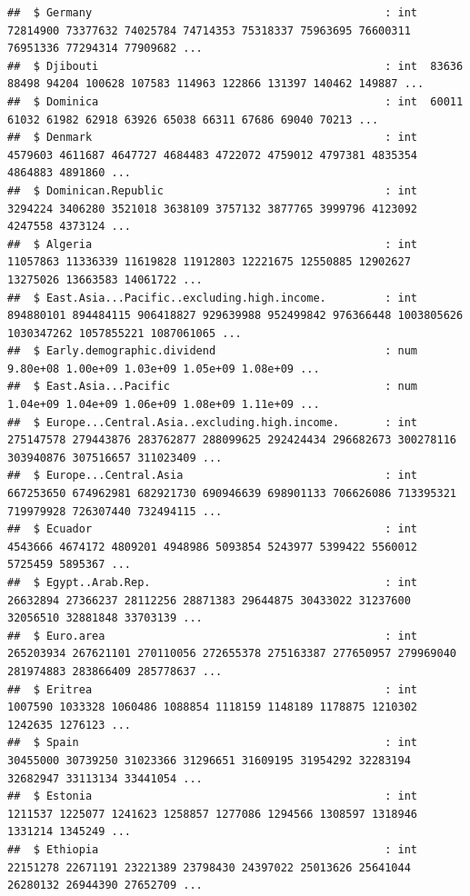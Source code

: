 \documentclass[12pt,]{article}
\begin{document}
\begin{verbatim}
##  $ Germany                                             : int  72814900 73377632 74025784 74714353 75318337 75963695 76600311 76951336 77294314 77909682 ...
##  $ Djibouti                                            : int  83636 88498 94204 100628 107583 114963 122866 131397 140462 149887 ...
##  $ Dominica                                            : int  60011 61032 61982 62918 63926 65038 66311 67686 69040 70213 ...
##  $ Denmark                                             : int  4579603 4611687 4647727 4684483 4722072 4759012 4797381 4835354 4864883 4891860 ...
##  $ Dominican.Republic                                  : int  3294224 3406280 3521018 3638109 3757132 3877765 3999796 4123092 4247558 4373124 ...
##  $ Algeria                                             : int  11057863 11336339 11619828 11912803 12221675 12550885 12902627 13275026 13663583 14061722 ...
##  $ East.Asia...Pacific..excluding.high.income.         : int  894880101 894484115 906418827 929639988 952499842 976366448 1003805626 1030347262 1057855221 1087061065 ...
##  $ Early.demographic.dividend                          : num  9.80e+08 1.00e+09 1.03e+09 1.05e+09 1.08e+09 ...
##  $ East.Asia...Pacific                                 : num  1.04e+09 1.04e+09 1.06e+09 1.08e+09 1.11e+09 ...
##  $ Europe...Central.Asia..excluding.high.income.       : int  275147578 279443876 283762877 288099625 292424434 296682673 300278116 303940876 307516657 311023409 ...
##  $ Europe...Central.Asia                               : int  667253650 674962981 682921730 690946639 698901133 706626086 713395321 719979928 726307440 732494115 ...
##  $ Ecuador                                             : int  4543666 4674172 4809201 4948986 5093854 5243977 5399422 5560012 5725459 5895367 ...
##  $ Egypt..Arab.Rep.                                    : int  26632894 27366237 28112256 28871383 29644875 30433022 31237600 32056510 32881848 33703139 ...
##  $ Euro.area                                           : int  265203934 267621101 270110056 272655378 275163387 277650957 279969040 281974883 283866409 285778637 ...
##  $ Eritrea                                             : int  1007590 1033328 1060486 1088854 1118159 1148189 1178875 1210302 1242635 1276123 ...
##  $ Spain                                               : int  30455000 30739250 31023366 31296651 31609195 31954292 32283194 32682947 33113134 33441054 ...
##  $ Estonia                                             : int  1211537 1225077 1241623 1258857 1277086 1294566 1308597 1318946 1331214 1345249 ...
##  $ Ethiopia                                            : int  22151278 22671191 23221389 23798430 24397022 25013626 25641044 26280132 26944390 27652709 ...

\end{verbatim}
\end{document}
